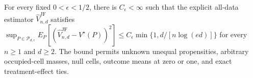 For every fixed \(0<\epsilon<1/2\), there is \(C_\epsilon<\infty\) such that the explicit all-data estimator \(\widehat V_{n,d}^{\mathrm{JF}}\) satisfies \(\sup_{P\in\mathcal P_{d,\epsilon}}E_P[(\widehat V_{n,d}^{\mathrm{JF}}-V^\star(P))^2]\leq C_\epsilon\min\{1,d/[n\log(ed)]\}\) for every \(n\geq1\) and \(d\geq2\). The bound permits unknown unequal propensities, arbitrary occupied-cell masses, null cells, outcome means at zero or one, and exact treatment-effect ties.